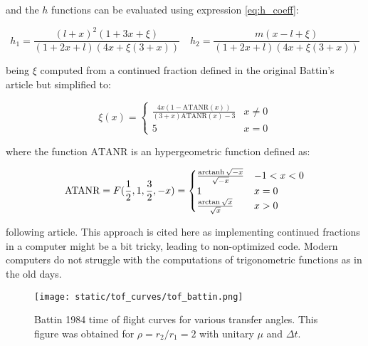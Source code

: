 and the $h$ functions can be evaluated using expression \ref{eq:h_coeff}:

\begin{equation}
  h_1 = \frac{(l+x)^2(1 + 3x + \xi)}{(1+2x+l)(4x + \xi(3+x))}\quad
  h_2 = \frac{m(x-l+\xi)}{(1+2x+l)(4x + \xi(3+x))}
  \label{eq:h_coeff}
\end{equation}

being $\xi$ computed from a continued fraction defined in the original Battin's
article but simplified to:

\begin{equation}
  \xi(x) =
  \begin{cases}
    \frac{4x(1 - \text{ATANR}(x))}{(3 +x)\text{ATANR}(x) - 3} &
    \text{$x\neq0$}                                                            \\
    5                                                         & \text{$x = 0$}
  \end{cases}
\end{equation}

where the function $\text{ATANR}$ is an hypergeometric function defined as:

\begin{equation}
  \text{ATANR} = F(\frac{1}{2}, 1, \frac{3}{2}, -x) =
  \begin{cases}
    \frac{\operatorname{arctanh}{\sqrt{-x}}}{\sqrt{-x}} & \text{$-1 < x < 0$} \\
    1                                     & \text{$x = 0$}      \\
    \frac{\arctan{\sqrt{x}}}{\sqrt{x}}    & \text{$x > 0$}
  \end{cases}
\end{equation}

following \cite{allen2015} article. This approach is cited here as
implementing continued fractions in a computer might be a bit tricky, leading to
non-optimized code. Modern computers do not struggle with the computations of
trigonometric functions as in the old days.

\vspace{0.5cm}
\begin{figure}[h]
  \centering
  \texttt{[image: static/tof\_curves/tof\_battin.png]}
  \caption[Battin 1984 time of flight curves]{Battin 1984 time of flight curves for various transfer angles. This
    figure was obtained for $\rho=r_2/r_1=2$ with unitary $\mu$ and $\Delta t$.}
  \label{fig:tof_battin}
\end{figure}


